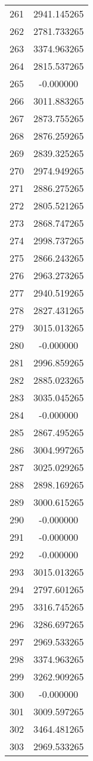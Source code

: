 \documentclass[12pt]{article}
\begin{document}
\begin{longtable}{@{}cc@{}}
261 & 2941.145265 \\
262 & 2781.733265 \\
263 & 3374.963265 \\
264 & 2815.537265 \\
265 & -0.000000 \\
266 & 3011.883265 \\
267 & 2873.755265 \\
268 & 2876.259265 \\
269 & 2839.325265 \\
270 & 2974.949265 \\
271 & 2886.275265 \\
272 & 2805.521265 \\
273 & 2868.747265 \\
274 & 2998.737265 \\
275 & 2866.243265 \\
276 & 2963.273265 \\
277 & 2940.519265 \\
278 & 2827.431265 \\
279 & 3015.013265 \\
280 & -0.000000 \\
281 & 2996.859265 \\
282 & 2885.023265 \\
283 & 3035.045265 \\
284 & -0.000000 \\
285 & 2867.495265 \\
286 & 3004.997265 \\
287 & 3025.029265 \\
288 & 2898.169265 \\
289 & 3000.615265 \\
290 & -0.000000 \\
291 & -0.000000 \\
292 & -0.000000 \\
293 & 3015.013265 \\
294 & 2797.601265 \\
295 & 3316.745265 \\
296 & 3286.697265 \\
297 & 2969.533265 \\
298 & 3374.963265 \\
299 & 3262.909265 \\
300 & -0.000000 \\
301 & 3009.597265 \\
302 & 3464.481265 \\
303 & 2969.533265 \\

\end{longtable}
\end{document}
